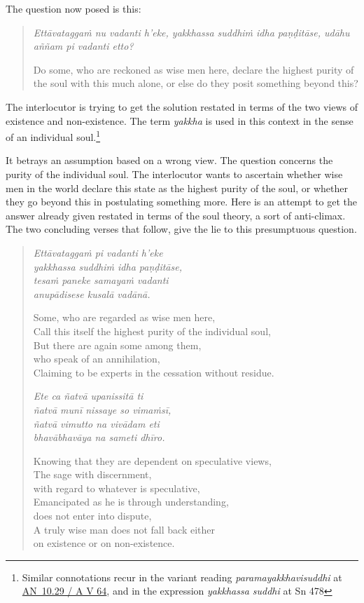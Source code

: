 The question now posed is this:

\begin{quote}
\emph{Ettāvataggaṁ nu vadanti h'eke, yakkhassa suddhiṁ idha paṇḍitāse, udāhu aññam pi vadanti etto?}

Do some, who are reckoned as wise men here, declare the highest purity of the soul with this much alone, or else do they posit something beyond this?
\end{quote}

The interlocutor is trying to get the solution restated in terms of the two views of existence and non-existence. The term \emph{yakkha} is used in this context in the sense of an individual soul.\footnote{Similar connotations recur in the variant reading \emph{paramayakkhavisuddhi} at \href{https://suttacentral.net/an10.29/pli/ms}{AN~10.29 / A V 64}, and in the expression \emph{yakkhassa suddhi} at Sn 478}

It betrays an assumption based on a wrong view. The question concerns the purity of the individual soul. The interlocutor wants to ascertain whether wise men in the world declare this state as the highest purity of the soul, or whether they go beyond this in postulating something more. Here is an attempt to get the answer already given restated in terms of the soul theory, a sort of anti-climax. The two concluding verses that follow, give the lie to this presumptuous question.

\begin{quote}
\emph{Ettāvataggaṁ pi vadanti h'eke}\\
\emph{yakkhassa suddhiṁ idha paṇḍitāse,}\\
\emph{tesaṁ paneke samayaṁ vadanti}\\
\emph{anupādisese kusalā vadānā.}

\clearpage

Some, who are regarded as wise men here,\\
Call this itself the highest purity of the individual soul,\\
But there are again some among them,\\
\vin who speak of an annihilation,\\
Claiming to be experts in the cessation without residue.

\emph{Ete ca ñatvā upanissitā ti}\\
\emph{ñatvā munī nissaye so vimaṁsī,}\\
\emph{ñatvā vimutto na vivādam eti}\\
\emph{bhavābhavāya na sameti dhīro.}

Knowing that they are dependent on speculative views,\\
The sage with discernment,\\
\vin with regard to whatever is speculative,\\
Emancipated as he is through understanding,\\
\vin does not enter into dispute,\\
A truly wise man does not fall back either\\
\vin on existence or on non-existence.
\end{quote}

